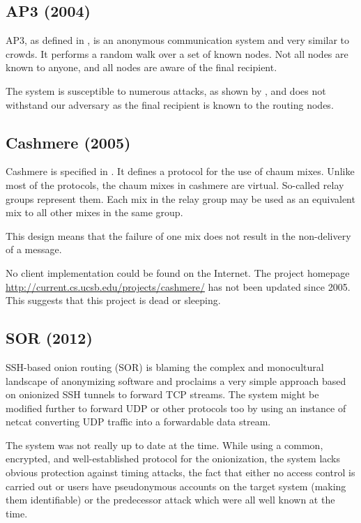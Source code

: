 \subsection{AP3 (2004)}
AP3, as defined in \cite{mislove2004ap3}, is an anonymous communication system and very similar to crowds. It performs a random walk over a set of known nodes. Not all nodes are known to anyone, and all nodes are aware of the final recipient. 

The system is susceptible to numerous attacks, as shown by \cite{ccs2008:mittal}, and does not withstand our adversary as the final recipient is known to the routing nodes. 

\subsection{Cashmere (2005)}
Cashmere is specified in \cite{zhuang2005cashmere}. It defines a protocol for the use of chaum mixes. Unlike most of the protocols, the chaum mixes in cashmere are virtual. So-called relay groups represent them. Each mix in the relay group may be used as an equivalent mix to all other mixes in the same group. 

This design means that the failure of one mix does not result in the non-delivery of a message.

No client implementation could be found on the Internet. The project homepage \href{http://current.cs.ucsb.edu/projects/cashmere/}{http://current.cs.ucsb.edu/projects/cashmere/} has not been updated since 2005. This suggests that this project is dead or sleeping.

\subsection{SOR (2012)}
SSH-based onion routing (SOR)\cite{Egners_2012} is blaming the complex and monocultural landscape of anonymizing software and proclaims a very simple approach based on onionized SSH tunnels to forward TCP streams. The system might be modified further to forward UDP or other protocols too by using an instance of netcat converting UDP traffic into a forwardable data stream.

The system was not really up to date at the time. While using a common, encrypted, and well-established protocol for the onionization, the system lacks obvious protection against timing attacks, the fact that either no access control is carried out or users have pseudonymous accounts on the target system (making them identifiable) or the predecessor attack\cite{wright2004predecessor} which were all well known at the time.

